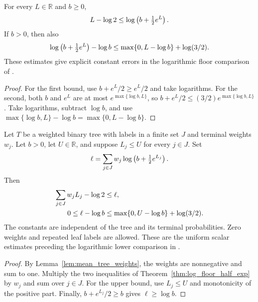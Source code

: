 \begin{theorem}
\label{thm:log_floor_half_exp}
\leanok
For every $L\in\mathbb R$ and $b\ge0$,
\begin{align}
 L-\log2\le\log\left(b+\tfrac12e^L\right).
 \notag
\end{align}
If $b>0$, then also
\begin{align}
 \log\left(b+\tfrac12e^L\right)-\log b
 \le\max\{0,L-\log b\}+\log(3/2).
 \notag
\end{align}
These estimates give explicit constant errors in the logarithmic floor
comparison of \cite[Section~8]{OpenAI2026AreaLaw}.
\end{theorem}

\begin{proof}\leanok
For the first bound, use $b+e^L/2\ge e^L/2$ and take logarithms.
For the second, both $b$ and $e^L$ are at most
$e^{\max\{\log b,L\}}$, so
$b+e^L/2\le(3/2)e^{\max\{\log b,L\}}$.
Take logarithms, subtract $\log b$, and use
$\max\{\log b,L\}-\log b=\max\{0,L-\log b\}$.
\end{proof}

\begin{theorem}
\label{thm:mean_tree_weighted_log_floor_exp}
\leanok
{}
Let $T$ be a weighted binary tree with labels in a finite set $J$ and
terminal weights $w_j$. Let $b>0$, let $U\in\mathbb R$, and suppose
$L_j\le U$ for every $j\in J$. Set
\begin{align}
 \ell=\sum_{j\in J}w_j\log\left(b+\tfrac12e^{L_j}\right).
 \notag
\end{align}
Then
\begin{align}
 \sum_{j\in J}w_jL_j-\log2&\le\ell,\notag\\
 0\le\ell-\log b&\le\max\{0,U-\log b\}+\log(3/2).
 \notag
\end{align}
The constants are independent of the tree and its terminal probabilities.
Zero weights and repeated leaf labels are allowed. These are the uniform
scalar estimates preceding the logarithmic lower comparison in
\cite[Section~8]{OpenAI2026AreaLaw}.
\end{theorem}

\begin{proof}\leanok
{}
By Lemma~\ref{lem:mean_tree_weights}, the weights are nonnegative and sum
to one. Multiply the two inequalities of
Theorem~\ref{thm:log_floor_half_exp} by $w_j$ and sum over $j\in J$.
For the upper bound, use $L_j\le U$ and monotonicity of the positive part.
Finally, $b+e^{L_j}/2\ge b$ gives $\ell\ge\log b$.
\end{proof}

